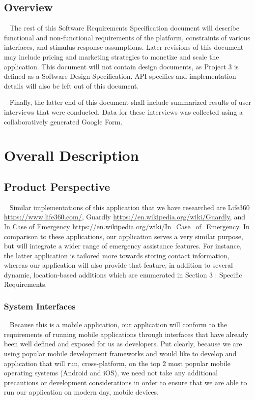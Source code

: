 \documentclass{scrreprt}
\begin{document}
\section{Overview}
\par ~ The rest of this Software Requirements Specification document will describe functional and non-functional requirements of the platform, constraints of various interfaces, and stimulus-response assumptions. Later revisions of this document may include pricing and marketing strategies to monetize and scale the application. This document will not contain design documents, as Project 3 is defined as a Software Design Specification. API specifics and implementation details will also be left out of this document. 

\par ~ Finally, the latter end of this document shall include summarized results of user interviews that were conducted. Data for these interviews was collected using a collaboratively generated Google Form.


\chapter{Overall Description}


\section{Product Perspective}
\par ~ Similar implementations of this application that we have researched are Life360 \url{https://www.life360.com/}, Guardly \url{https://en.wikipedia.org/wiki/Guardly}, and In Case of Emergency \url{https://en.wikipedia.org/wiki/In_Case_of_Emergency}. In comparison to these applications, our application serves a very similar purpose, but will integrate a wider range of emergency assistance features. For instance, the latter application is tailored more towards storing contact information, whereas our application will also provide that feature, in addition to several dynamic, location-based additions which are enumerated in Section 3 : Specific Requirements.


\subsection{System Interfaces}
\par ~ Because this is a mobile application, our application will conform to the requirements of running mobile applications through interfaces that have already been well defined and exposed for us as developers. Put clearly, because we are using popular mobile development frameworks and would like to develop and application that will run, cross-platform, on the top 2 most popular mobile operating systems (Android and iOS), we need not take any additional precautions or development considerations in order to ensure that we are able to run our application on modern day, mobile devices.
\end{document}
